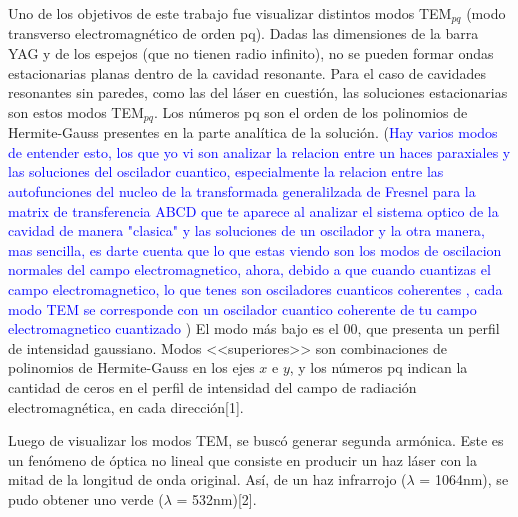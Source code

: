 \documentclass[10pt, a4paper]{article}%
\begin{document}
\begin{multicols}{2}
Uno de los objetivos de este trabajo fue visualizar distintos modos TEM$_{pq}$ (modo transverso electromagnético de orden pq). Dadas las dimensiones de la barra YAG y de los espejos (que no tienen radio infinito), no se pueden formar ondas estacionarias planas dentro de la cavidad resonante. Para el caso de cavidades resonantes sin paredes, como las del láser en cuestión, las soluciones estacionarias son estos modos TEM$_{pq}$. Los números pq son el orden de los polinomios de Hermite-Gauss presentes en la parte analítica de la solución.  %
(\textcolor{Blue}{Hay varios modos de entender esto, los que yo vi son analizar la relacion entre un haces paraxiales y las soluciones del oscilador cuantico, especialmente la relacion entre las autofunciones del nucleo de la transformada generalilzada de Fresnel para la matrix de transferencia ABCD que te aparece al analizar el sistema optico de la cavidad de manera "clasica" y las soluciones de un oscilador y la otra manera, mas sencilla, es darte cuenta que lo que estas viendo son los modos de oscilacion normales del campo electromagnetico, ahora, debido a que cuando cuantizas el campo electromagnetico, lo que tenes son osciladores cuanticos coherentes , cada modo TEM se corresponde con un oscilador cuantico coherente de tu campo electromagnetico cuantizado })
El modo más bajo es el 00, que presenta un perfil de intensidad gaussiano. Modos <<superiores>> son combinaciones de polinomios de Hermite-Gauss en los ejes $x$ e $y$, y los números pq indican la cantidad de ceros en el perfil de intensidad del campo de radiación electromagnética, en cada dirección[1].

Luego de visualizar los modos TEM, se buscó generar segunda armónica. Este es un fenómeno de óptica no lineal que consiste en producir un haz láser con la mitad de la longitud de onda original. Así, de un haz infrarrojo ($\lambda$ = 1064nm), se pudo obtener uno verde ($\lambda$ = 532nm)[2].



\end{multicols}
\end{document}
